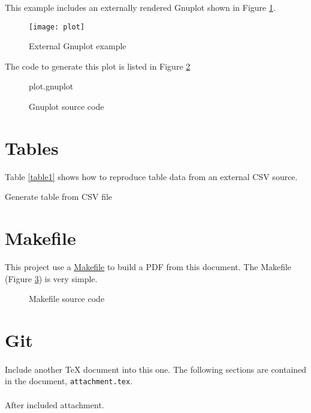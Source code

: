 \documentclass[10pt,a4paper]{article}
\begin{document}
This example includes an externally rendered Gnuplot shown in Figure
\ref{fig:external}.
\begin{figure}
  \centering
  \texttt{[image: plot]}
  \caption{External Gnuplot example}
  \label{fig:external}
\end{figure}
The code to generate this plot is listed in Figure \ref{lst:external}
\begin{figure}
  \begin{lstinputlisting}[language=Gnuplot,style=default]{plot.gnuplot}
  \end{lstinputlisting}
  \caption{Gnuplot source code}
  \label{lst:external}
\end{figure}

\sectionbreak{}

\section*{Tables}

Table \ref{table1} shows how to reproduce table data from an external CSV
source.
\begin{table}
  \begin{center}
    \caption{Generate table from CSV file}
    \label{table1}
  \end{center}
\end{table}

\lipsum[3]

\sectionbreak{}

\section*{Makefile}

This project use a \href{https://www.gnu.org/software/make/}{Makefile} to build
a PDF from this document. The Makefile (Figure \ref{lst:Makefile}) is very simple.
\begin{figure}
  
  \caption{Makefile source code}
  \label{lst:Makefile}
\end{figure}

\sectionbreak{}

\section*{Git}

\paragraph{}
Include another TeX document into this one. The following sections are
contained in the document, \texttt{attachment.tex}.



\paragraph{}
After included attachment.
\end{document}
